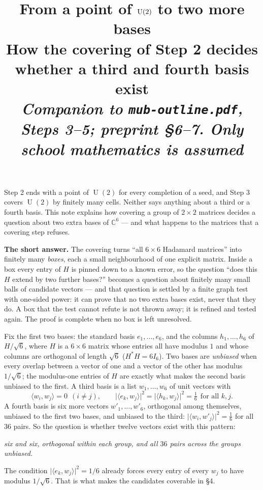 \documentclass[11pt]{article}
\title{\bfseries From a point of $\U(2)$ to two more bases\\[5pt]
\large\normalfont How the covering of Step 2 decides whether a third and fourth basis exist\\[3pt]
\normalsize\itshape Companion to \texttt{mub-outline.pdf}, Steps 3--5; preprint \S6--7.
Only school mathematics is assumed}
\author{}
\date{}
\newcommand{\C}{\mathbb{C}}
\newcommand{\inner}[2]{\langle #1,#2\rangle}
\newcommand{\abs}[1]{\lvert #1\rvert}
\DeclareMathOperator{\U}{U}
\newcommand{\key}[1]{\par\Needspace{4\baselineskip}\medskip\noindent{\normalsize\bfseries #1}\par\nobreak\vspace{-1pt}}
\begin{document}
\maketitle

\noindent
Step 2 ends with a point of $\U(2)$ for every completion of a seed, and Step 3 covers $\U(2)$ by finitely
many cells. Neither says anything about a third or a fourth basis. This note explains how covering a
group of $2\times2$ matrices decides a question about two extra bases of $\C^6$ --- and what happens to
the matrices that a covering step refuses.

\smallskip
\noindent
\textbf{The short answer.} The covering turns ``all $6\times6$ Hadamard matrices'' into finitely many
\emph{boxes}, each a small neighbourhood of one explicit matrix. Inside a box every entry of $H$ is
pinned down to a known error, so the question ``does this $H$ extend by two further bases?'' becomes a
question about finitely many small balls of candidate vectors --- and that question is settled by a
finite graph test with one-sided power: it can prove that no two extra bases exist, never that they do.
A box that the test cannot refute is not thrown away; it is refined and tested again. The proof is
complete when no box is left unresolved.

\key{1.\ What would have to exist}

Fix the first two bases: the standard basis $e_1,\dots,e_6$, and the columns $h_1,\dots,h_6$ of
$H/\sqrt6$, where $H$ is a $6\times6$ matrix whose entries all have modulus $1$ and whose columns are
orthogonal of length $\sqrt6$ ($H^*H=6I_6$). Two bases are \emph{unbiased} when every overlap between
a vector of one and a vector of the other has modulus $1/\sqrt6$; the modulus-one entries of $H$ are
exactly what makes the second basis unbiased to the first. A third basis is a list $w_1,\dots,w_6$ of
unit vectors with
\[
\inner{w_i}{w_j}=0\ \ (i\ne j),\qquad
\abs{\inner{e_k}{w_j}}^2=\abs{\inner{h_k}{w_j}}^2=\tfrac16\ \ \text{for all }k,j .
\]
A fourth basis is six more vectors $w'_1,\dots,w'_6$, orthogonal among themselves, unbiased to the first
two bases, and unbiased to the third: $\abs{\inner{w_i}{w'_j}}^2=\tfrac16$ for all $36$ pairs. So the
question is whether twelve vectors exist with this pattern:
\begin{center}
\emph{six and six, orthogonal within each group, and all $36$ pairs across the groups unbiased.}
\end{center}
The condition $\abs{\inner{e_k}{w_j}}^2=1/6$ already forces every entry of every $w_j$ to have modulus
$1/\sqrt6$. That is what makes the candidates coverable in \S4.
\end{document}
